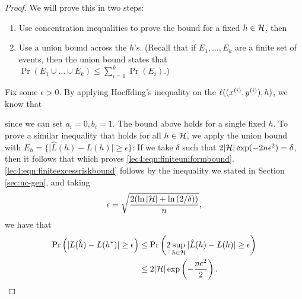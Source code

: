 \begin{proof}
We will prove this in two steps:
\begin{enumerate}
\item Use concentration inequalities to prove the bound for a fixed $h \in \cH$, then
\item Use a union bound across the $h$'s. (Recall that if $E_1, \dots, E_k$ are a finite set of events, then the union bound states that $\Pr ( E_1 \cup \dots \cup E_k) \leq \sum_{i = 1}^k \Pr(E_i)$.)
\end{enumerate}

Fix some $\epsilon > 0$. By applying Hoeffding's inequality on the $\ell( (x\sp{i}, y\sp{i}), h)$, we know that 

since we can set $a_i = 0, b_i = 1$. The bound above holds for a single fixed $h$. To prove a similar inequality that holds for all $h \in \cH$, we apply the union bound with $E_h = \{\vert \hat{L}(h) - L(h) \vert \geq \epsilon \}$:
If we take $\delta$ such that $2\vert \cH \vert \exp(-2n\epsilon^2) = \delta$, then it follows that 
which proves \eqref{lec4:eqn:finiteuniformbound}. \eqref{lec4:eqn:finiteexcessriskbound} follows by the inequality we stated in Section \ref{sec:uc-gen}, and taking 
\begin{align}
    \epsilon = \sqrt{\frac{ 2(\ln{\vert \cH \vert} + \ln{(2 / \delta)}) }{n}},
\end{align}
we have that
\begin{align}
\Pr \left( | L(\hat{h}) - L(h^{*}) | \geq \epsilon \right) &\leq \Pr \left( 2 \sup_{h \in \cH} | \hat{L}(h) - L(h) | \geq \epsilon \right) \\
&\leq 2 |\cH| \exp \left( -\frac{n\epsilon^2}{2} \right).
\end{align}
\end{proof}

